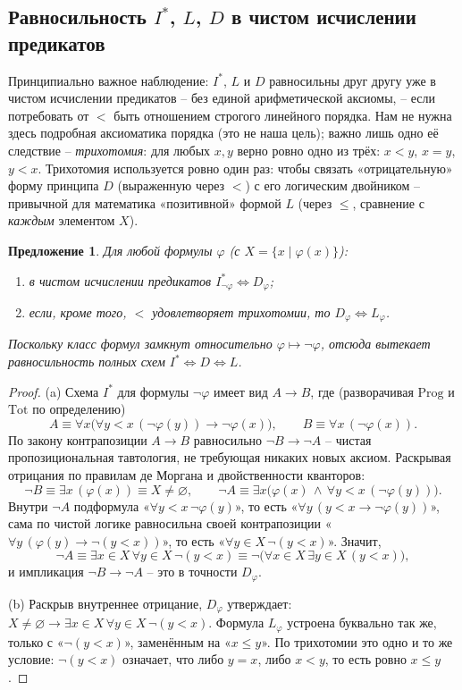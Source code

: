 \documentclass[12pt,a4paper]{article}
\theoremstyle{plain}
\newtheorem{proposition}[theorem]{Предложение}
\theoremstyle{definition}
\newcommand{\ph}{\varphi}
\newcommand{\toinf}{\rightarrow}
\begin{document}
\subsection{Равносильность $I^*$, $L$, $D$ в чистом исчислении предикатов}
Принципиально важное наблюдение: $I^*$, $L$ и $D$ равносильны друг другу уже в чистом исчислении предикатов -- без единой арифметической аксиомы, -- если потребовать от $<$ быть отношением строгого линейного порядка. Нам не нужна здесь подробная аксиоматика порядка (это не наша цель); важно лишь одно её следствие -- \emph{трихотомия}: для любых $x,y$ верно ровно одно из трёх: $x<y$, $x=y$, $y<x$. Трихотомия используется ровно один раз: чтобы связать «отрицательную» форму принципа $D$ (выраженную через $<$) с его логическим двойником -- привычной для математика «позитивной» формой $L$ (через $\leqslant$, сравнение с \emph{каждым} элементом $X$).

\begin{proposition}
Для любой формулы $\ph$ (с $X=\{x \mid \ph(x)\}$):
\begin{enumerate}[label=(\alph*)]
    \item в чистом исчислении предикатов $I^*_{\neg\ph} \iff D_\ph$;
    \item если, кроме того, $<$ удовлетворяет трихотомии, то $D_\ph \iff L_\ph$.
\end{enumerate}
Поскольку класс формул замкнут относительно $\ph\mapsto\neg\ph$, отсюда вытекает равносильность полных схем $I^*\iff D\iff L$.
\end{proposition}
\begin{proof}
(a) Схема $I^*$ для формулы $\neg\ph$ имеет вид $A\toinf B$, где (разворачивая $\mathrm{Prog}$ и $\mathrm{Tot}$ по определению)
$$A \equiv \forall x\big(\forall y{<}x\,(\neg\ph(y)) \toinf \neg\ph(x)\big), \qquad B\equiv \forall x\,(\neg\ph(x)).$$
По закону контрапозиции $A\toinf B$ равносильно $\neg B\toinf\neg A$ -- чистая пропозициональная тавтология, не требующая никаких новых аксиом. Раскрывая отрицания по правилам де Моргана и двойственности кванторов:
$$\neg B \equiv \exists x\,(\ph(x)) \equiv X\ne\varnothing, \qquad \neg A \equiv \exists x\big(\ph(x)\,\land\,\forall y{<}x\,(\neg\ph(y))\big).$$
Внутри $\neg A$ подформула «$\forall y{<}x\,\neg\ph(y)$», то есть «$\forall y\,(y<x\toinf\neg\ph(y))$», сама по чистой логике равносильна своей контрапозиции «$\forall y\,(\ph(y)\toinf\neg(y<x))$», то есть «$\forall y\in X\,\neg(y<x)$». Значит,
$$\neg A \equiv \exists x\in X\,\forall y\in X\,\neg(y<x) \equiv \neg\big(\forall x\in X\,\exists y\in X\,(y<x)\big),$$
и импликация $\neg B\toinf\neg A$ -- это в точности $D_\ph$.

(b) Раскрыв внутреннее отрицание, $D_\ph$ утверждает: $X\ne\varnothing\toinf\exists x\in X\,\forall y\in X\,\neg(y<x)$. Формула $L_\ph$ устроена буквально так же, только с «$\neg(y<x)$», заменённым на «$x\leqslant y$». По трихотомии это одно и то же условие: $\neg(y<x)$ означает, что либо $y=x$, либо $x<y$, то есть ровно $x\leqslant y$.
\end{proof}
\end{document}
